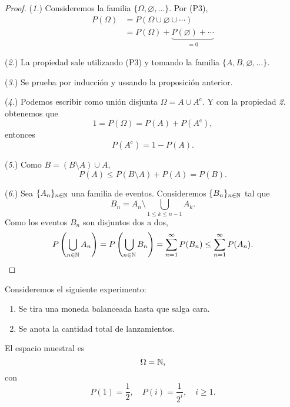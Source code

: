 \begin{proof}
    (\textit{1.}) Consideremos la familia $\{ \Omega, \varnothing, \ldots \}$. Por (P3), 
    \begin{align*}
        P(\Omega) &= P(\Omega \cup \varnothing \cup \cdots) \\
        &= P(\Omega) + \underbrace{P(\varnothing) + \cdots}_{=0}
    \end{align*}

    (\textit{2.}) La propiedad sale utilizando (P3) y tomando la familia $\{ A, B, \varnothing, \ldots \}$.

    (\textit{3.}) Se prueba por inducción y ussando la proposición anterior.

    (\textit{4.}) Podemos escribir como unión disjunta $\Omega = A \cup A^{\mathrm{c}}$. Y con la propiedad \textit{2.} obtenemos que
    \begin{equation*}
        1 = P(\Omega) = P(A) + P(A^{\mathrm{c}}),
    \end{equation*}
    entonces
    \begin{equation*}
        P(A^{\mathrm{c}}) = 1 - P(A).
    \end{equation*}

    (\textit{5.}) Como $B = (B \setminus A) \cup A$,
    \begin{equation*}
        P(A) \leq P(B \setminus A) + P(A) = P(B).
    \end{equation*}

    (\textit{6.}) Sea $\{A_n\}_{n \in \mathbb{N}}$ una familia de eventos. Consideremos $\{B_n\}_{n \in \mathbb{N}}$ tal que
    \begin{equation*}
        B_n = A_n \setminus \bigcup_{1 \leq k \leq n-1} A_k.
    \end{equation*}
    Como los eventos $B_n$ son disjuntos dos a dos,
    \begin{equation*}
        P\left(\bigcup_{n \in \mathbb{N}} A_n\right) = P\left(\bigcup_{n \in \mathbb{N}} B_n\right) = \sum_{n = 1}^{\infty} P(B_n) \leq \sum_{n = 1}^{\infty} P(A_n).
    \end{equation*}
\end{proof}

\begin{example}
    \label{ex:moneda-hasta-cara}
    Consideremos el siguiente experimento:
    \begin{centeredvarwidth}
        \begin{enumerate}
            \item Se tira una moneda balanceada hasta que salga cara.
            \item Se anota la cantidad total de lanzamientos.
        \end{enumerate}
    \end{centeredvarwidth}

    El espacio muestral es
    \begin{equation*}
        \Omega = \mathbb{N},
    \end{equation*}
    con
    \begin{equation*}
        P(1) = \frac{1}{2}, \quad P(i) = \frac{1}{2^i}, \quad i \geq 1.
    \end{equation*}
\end{example}

